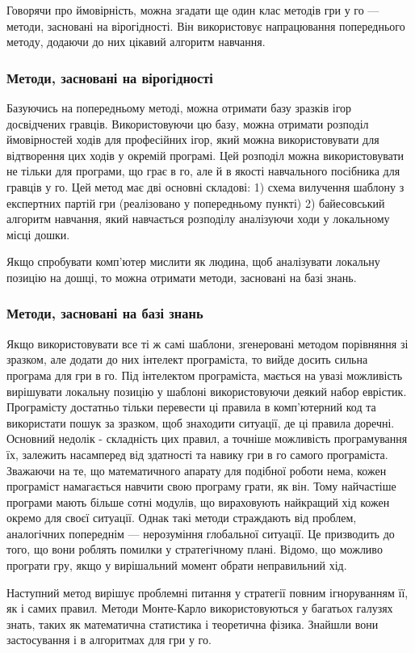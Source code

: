 Говорячи про ймовірність, можна згадати ще один клас методів гри у го --- методи, засновані на вірогідності. Він використовує напрацювання попереднього методу, додаючи до них цікавий алгоритм навчання.
\subsubsection{Методи, засновані на вірогідності}
Базуючись на попередньому методі, можна отримати базу зразків ігор досвідчених гравців. Використовуючи цю базу, можна отримати розподіл ймовірностей ходів для професійних ігор, який можна використовувати для відтворення цих ходів у окремій програмі. Цей розподіл можна використовувати не тільки для програми, що грає в го, але й в якості навчального посібника для гравців у го. Цей метод має дві основні складові: 1) схема вилучення шаблону з експертних партій гри (реалізовано у попередньому пункті) 2) байесовський алгоритм навчання, який навчається розподілу аналізуючи ходи у локальному місці дошки.

Якщо спробувати комп'ютер мислити як людина, щоб аналізувати локальну позицію на дошці, то можна отримати методи, засновані на базі знань.
\subsubsection{Методи, засновані на базі знань}
Якщо використовувати все ті ж самі шаблони, згенеровані методом порівняння зі зразком, але додати до них інтелект програміста, то вийде досить сильна програма для гри в го. Під інтелектом програміста, мається на увазі можливість вирішувати локальну позицію у шаблоні використовуючи деякий набор еврістик. Програмісту достатньо тільки перевести ці правила в комп'ютерний код та використати пошук за зразком, щоб знаходити ситуації, де ці правила доречні. Основний недолік - складність цих правил, а точніше можливість програмування їх, залежить насамперед від здатності та навику гри в го самого програміста. Зважаючи на те, що математичного апарату для подібної роботи нема, кожен програміст намагається навчити свою програму грати, як він. Тому найчастіше програми мають більше сотні модулів, що вираховують найкращий хід кожен окремо для своєї ситуації. Однак такі методи страждають від проблем, аналогічних попереднім --- нерозуміння глобальної ситуації. Це призводить до того, що вони роблять помилки у стратегічному плані. Відомо, що можливо програти гру, якщо у вирішальний момент обрати неправильний хід.

Наступний метод вирішує проблемні питання у стратегії повним ігноруванням її, як і самих правил. Методи Монте-Карло використовуються у багатьох галузях знать, таких як математична статистика і теоретична фізика. Знайшли вони застосування і в алгоритмах для гри у го.
